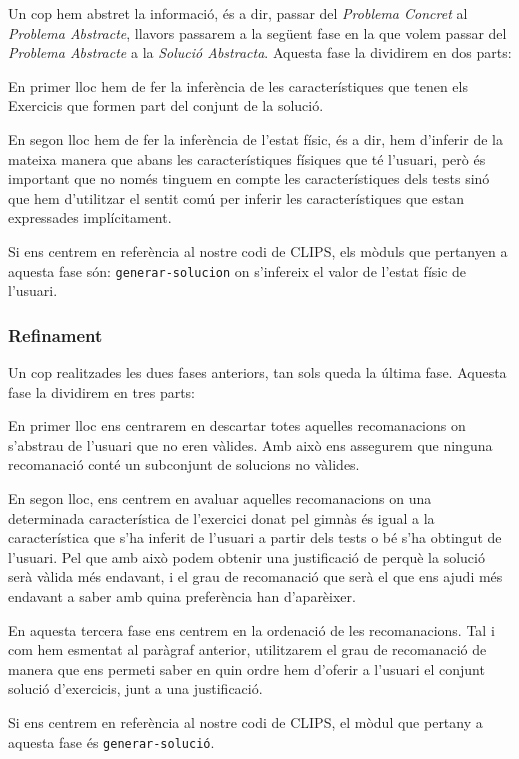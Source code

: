 \documentclass[a4paper, 12pt, UTF8]{article}
\begin{document}
Un cop hem abstret la informació, és a dir, passar del \emph{Problema Concret} al \emph{Problema Abstracte}, llavors passarem a la següent fase en la que volem passar del \emph{Problema Abstracte} a la \emph{Solució Abstracta}. Aquesta fase la dividirem en dos parts:

En primer lloc hem de fer la inferència de les característiques que tenen els Exercicis que formen part del conjunt de la solució.

En segon lloc hem de fer la inferència de l'estat físic, és a dir, hem d'inferir de la mateixa manera que abans les característiques físiques que té l'usuari, però és important que no només tinguem en compte les característiques dels tests sinó que hem d'utilitzar el sentit comú per inferir les característiques que estan expressades implícitament.

Si ens centrem en referència al nostre codi de CLIPS, els mòduls que pertanyen a aquesta fase són: \verb|generar-solucion| on s'infereix el valor de l'estat físic de l'usuari.

\subsubsection{Refinament}

Un cop realitzades les dues fases anteriors, tan sols queda la última fase. Aquesta fase la dividirem en tres parts:

En primer lloc ens centrarem en descartar totes aquelles recomanacions on s'abstrau de l'usuari que no eren vàlides. Amb això ens assegurem que ninguna recomanació conté un subconjunt de solucions no vàlides.

En segon lloc, ens centrem en avaluar aquelles recomanacions on una determinada característica de l'exercici donat pel gimnàs és igual a la característica que s'ha inferit de l'usuari a partir dels tests o bé s'ha obtingut de l'usuari. Pel que amb això podem obtenir una justificació de perquè la solució serà vàlida més endavant, i el grau de recomanació que serà el que ens ajudi més endavant a saber amb quina preferència han d'aparèixer.

En aquesta tercera fase ens centrem en la ordenació de les recomanacions. Tal i com hem esmentat al paràgraf anterior, utilitzarem el grau de recomanació de manera que ens permeti saber en quin ordre hem d'oferir a l'usuari el conjunt solució d'exercicis, junt a una justificació.

Si ens centrem en referència al nostre codi de CLIPS, el mòdul que pertany a aquesta fase és \verb|generar-solució|.
\end{document}
